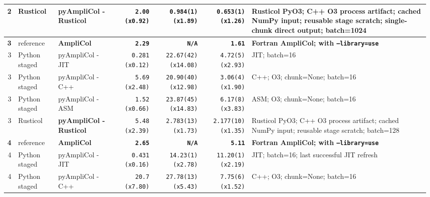 \documentclass[10pt]{article}
\begin{document}
\begin{landscape}
\begin{center}
\begin{tabular}{@{}r L{0.92in} L{1.52in} r r r L{3.18in}@{}}
 2 & Rusticol & \textbf{pyAmpliCol - Rusticol} & \texttt{2.00} \textcolor{speedgreen}{\texttt{(x0.92)}} & \texttt{0.984(1)} \textcolor{speedorange}{\texttt{(x1.89)}} & \texttt{0.653(1)} \textcolor{speedorange}{\texttt{(x1.26)}} & Rusticol PyO3; C++ O3 process artifact; cached NumPy input; reusable stage scratch; single-chunk direct output; batch=1024 \\
\midrule[0.58pt]
 \textbf{3} & reference & \textbf{AmpliCol} & \textbf{\texttt{2.29}} & \textbf{\texttt{N/A}} & \textbf{\texttt{1.61}} & \textbf{Fortran AmpliCol; with \texttt{--library=use}} \\
3 & Python staged & pyAmpliCol - JIT & \texttt{0.281} \textcolor{speedgreen}{\texttt{(x0.12)}} & \texttt{22.67(42)} \textcolor{speedred}{\texttt{(x14.08)}} & \texttt{4.72(5)} \textcolor{speedred}{\texttt{(x2.93)}} & JIT; batch=16 \\
3 & Python staged & pyAmpliCol - C++ & \texttt{5.69} \textcolor{speedred}{\texttt{(x2.48)}} & \texttt{20.90(40)} \textcolor{speedred}{\texttt{(x12.98)}} & \texttt{3.06(4)} \textcolor{speedorange}{\texttt{(x1.90)}} & C++; O3; chunk=None; batch=16 \\
3 & Python staged & pyAmpliCol - ASM & \texttt{1.52} \textcolor{speedgreen}{\texttt{(x0.66)}} & \texttt{23.87(45)} \textcolor{speedred}{\texttt{(x14.83)}} & \texttt{6.17(8)} \textcolor{speedred}{\texttt{(x3.83)}} & ASM; O3; chunk=None; batch=16 \\
 3 & Rusticol & \textbf{pyAmpliCol - Rusticol} & \texttt{5.48} \textcolor{speedred}{\texttt{(x2.39)}} & \texttt{2.783(13)} \textcolor{speedorange}{\texttt{(x1.73)}} & \texttt{2.177(10)} \textcolor{speedorange}{\texttt{(x1.35)}} & Rusticol PyO3; C++ O3 process artifact; cached NumPy input; reusable stage scratch; batch=128 \\
\midrule[0.58pt]
 \textbf{4} & reference & \textbf{AmpliCol} & \textbf{\texttt{2.65}} & \textbf{\texttt{N/A}} & \textbf{\texttt{5.11}} & \textbf{Fortran AmpliCol; with \texttt{--library=use}} \\
4 & Python staged & pyAmpliCol - JIT & \texttt{0.431} \textcolor{speedgreen}{\texttt{(x0.16)}} & \texttt{14.23(1)} \textcolor{speedred}{\texttt{(x2.78)}} & \texttt{11.20(1)} \textcolor{speedred}{\texttt{(x2.19)}} & JIT; batch=16; last successful JIT refresh \\
4 & Python staged & pyAmpliCol - C++ & \texttt{20.7} \textcolor{speedred}{\texttt{(x7.80)}} & \texttt{27.78(13)} \textcolor{speedred}{\texttt{(x5.43)}} & \texttt{7.75(6)} \textcolor{speedorange}{\texttt{(x1.52)}} & C++; O3; chunk=None; batch=16 \\

\end{tabular}
\end{center}
\end{landscape}
\end{document}
